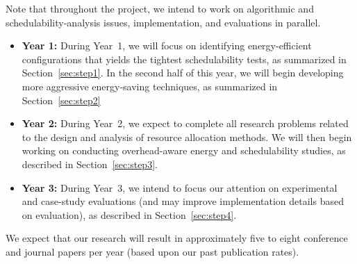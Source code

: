 Note that throughout the project, we intend to work on algorithmic and schedulability-analysis issues, implementation, and evaluations in parallel.
\vspace{-2mm}

\begin{itemize}\itemsep 0pt \parskip 0pt
\item \textbf{Year 1:} During Year~1, we will focus on identifying energy-efficient configurations that yields the tightest schedulability tests, as summarized in Section~\ref{sec:step1}. In the second half of this year, we will begin  developing more aggressive energy-saving techniques, as summarized in Section~\ref{sec:step2}
\item \textbf{Year 2:} During Year~2, we expect to complete all research problems related to the design and analysis of resource allocation methods. We will then begin working on conducting overhead-aware energy and schedulability studies, as described in Section~\ref{sec:step3}.
\item \textbf{Year 3:} During Year~3, we intend to focus our attention on experimental and case-study evaluations (and  may improve implementation details based on evaluation), as described in Section~\ref{sec:step4}.
\end{itemize}

\vspace{-2mm}
We expect that our research will result in approximately five to eight conference and journal papers per year (based upon our past publication rates).
